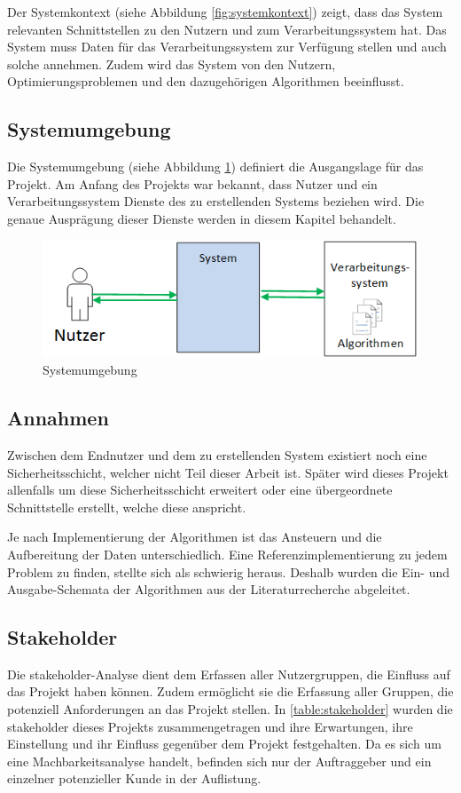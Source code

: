 Der Systemkontext (siehe Abbildung \ref{fig:systemkontext}) zeigt, dass das System relevanten Schnittstellen zu den Nutzern und zum Verarbeitungssystem hat. Das System muss Daten 
für das Verarbeitungssystem zur Verfügung stellen und auch solche annehmen. Zudem wird das System von den Nutzern, Optimierungsproblemen und den dazugehörigen Algorithmen 
beeinflusst.

\FloatBarrier
\subsection{Systemumgebung}\label{systemumgebung}
Die Systemumgebung (siehe Abbildung \ref{fig:systemumgebung}) definiert die Ausgangslage für das Projekt. Am Anfang des Projekts war bekannt, dass Nutzer und ein Verarbeitungssystem 
Dienste des zu erstellenden Systems beziehen wird. Die genaue Ausprägung dieser Dienste werden in diesem Kapitel behandelt.

\begin{figure}[h]
\centering
\includegraphics[scale=0.8]{images/visio/systemumgebung.png}
\caption[Systemumgebung]{Systemumgebung \selfmade{}}
\label{fig:systemumgebung}
\end{figure}

\FloatBarrier
\subsection{Annahmen}\label{annahmen}
Zwischen dem Endnutzer und dem zu erstellenden System existiert noch eine Sicherheitsschicht, welcher nicht Teil dieser Arbeit ist. Später wird dieses Projekt allenfalls um diese Sicherheitsschicht 
erweitert oder eine übergeordnete Schnittstelle erstellt, welche diese anspricht. 

Je nach Implementierung der Algorithmen ist das Ansteuern und die Aufbereitung der Daten unterschiedlich. Eine Referenzimplementierung zu jedem Problem zu finden, stellte sich als schwierig 
heraus. Deshalb wurden die Ein- und Ausgabe-Schemata der Algorithmen aus der Literaturrecherche abgeleitet.

\newpage
\subsection{Stakeholder}\label{stakeholder}
Die \gls{stakeholder}-Analyse dient dem Erfassen aller Nutzergruppen, die Einfluss auf das Projekt haben können. Zudem ermöglicht sie die Erfassung aller Gruppen, die potenziell 
Anforderungen an das Projekt stellen. In \autoref{table:stakeholder} wurden die \gls{stakeholder} dieses Projekts zusammengetragen und ihre Erwartungen, ihre 
Einstellung und ihr Einfluss gegenüber dem Projekt festgehalten. Da es sich um eine Machbarkeitsanalyse handelt, befinden sich nur der Auftraggeber und ein einzelner potenzieller Kunde in der 
Auflistung.

